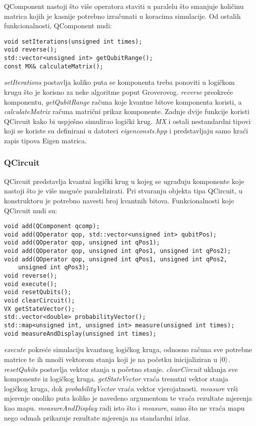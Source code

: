 QComponent nastoji što više operatora staviti u paralelu što smanjuje količinu matrica kojih je kasnije potrebno izračunati u koracima simulacije. Od ostalih funkcionalnosti, QComponent nudi:
\begin{lstlisting}
void setIterations(unsigned int times);
void reverse();
std::vector<unsigned int> getQubitRange();
const MX& calculateMatrix();
\end{lstlisting}
\emph{setIterations} postavlja koliko puta se komponenta treba ponoviti u logičkom krugu što je korisno za neke algoritme poput Groverovog. \emph{reverse} preokreće komponentu, \emph{getQubitRange} računa koje kvantne bitove komponenta koristi, a \emph{calculateMatrix} računa matrični prikaz komponente. Zadnje dvije funkcije koristi QCircuit kako bi uspješno simulirao logički krug. \emph{MX} i ostali nestandardni tipovi koji se koriste su definirani u datoteci \emph{eigenconsts.hpp} i predstavljaju samo kraći zapis tipova Eigen matrica.

\subsubsection{QCircuit}

QCircuit predstavlja kvantni logički krug u kojeg se ugrađuju komponente koje nastoji što je više moguće paralelizirati. Pri stvaranju objekta tipa QCircuit, u konstruktoru je potrebno navesti broj kvantnih bitova. Funkcionalnosti koje QCircuit nudi su:
\begin{lstlisting}
void add(QComponent qcomp);
void add(QOperator qop, std::vector<unsigned int> qubitPos);
void add(QOperator qop, unsigned int qPos1);
void add(QOperator qop, unsigned int qPos1, unsigned int qPos2);
void add(QOperator qop, unsigned int qPos1, unsigned int qPos2,
	unsigned int qPos3);
void reverse();
void execute();
void resetQubits();
void clearCircuit();
VX getStateVector();
std:.vector<double> probabilityVector();
std::map<unsigned int, unsigned int> measure(unsigned int times);
void measureAndDisplay(unsigned int times);
\end{lstlisting}
\emph{execute} pokreće simulaciju kvantnog logičkog kruga, odnosno računa sve potrebne matrice te ih množi vektorom stanja koji je na početku inicijaliziran u $\ket{0}$. \emph{resetQubits} postavlja vektor stanja u početno stanje. \emph{clearCircuit} uklanja sve komponente iz logičkog kruga. \emph{getStateVector} vraća trenutni vektor stanja logičkog kruga, dok \emph{probabilityVector} vraća vektor vjerojatnosti. \emph{measure} vrši mjerenje onoliko puta koliko je navedeno argumentom te vraća rezultate mjerenja kao mapu. \emph{measureAndDisplay} radi isto što i \emph{measure}, samo što ne vraća mapu nego odmah prikazuje rezultate mjerenja na standardni izlaz.


